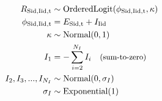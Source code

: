 \documentclass[12pt]{article}
\begin{document}
\newpage

\begin{align*}
    R_{\mathrm{Sid},\mathrm{Iid},\mathrm{t}}    &\sim \text{OrderedLogit}( \phi_{\mathrm{Sid},\mathrm{Iid},\mathrm{t}}, \kappa )    \\
    \phi_{\mathrm{Sid},\mathrm{Iid},\mathrm{t}} &= E_{\mathrm{Sid},\mathrm{t}} + I_{\mathrm{Iid}}                           \\
    \kappa                    &\sim \text{Normal}(0, 1)         \\
    I_1                       & = - \sum_{i=2}^{N_I} I_i ~~~ \text{\small(sum-to-zero)}  \\
    I_2, I_3, ..., I_{N_I}    &\sim \text{Normal}(0, \sigma_I)  \\
    \sigma_I                  &\sim \text{Exponential}(1)
\end{align*}
 
\end{document}
